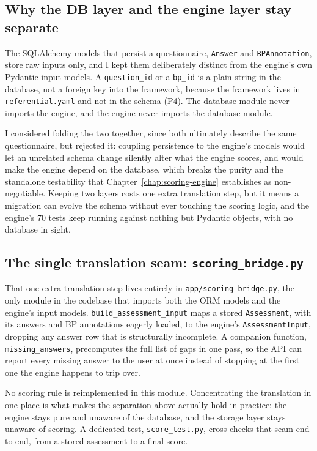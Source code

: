 \subsection{Why the DB layer and the engine layer stay separate}

The SQLAlchemy models that persist a questionnaire, \texttt{Answer} and \texttt{BPAnnotation}, store raw inputs only, and I kept them deliberately distinct from the engine's own Pydantic input models. A \texttt{question\_\allowbreak id} or a \texttt{bp\_\allowbreak id} is a plain string in the database, not a foreign key into the framework, because the framework lives in \texttt{referential.\allowbreak yaml} and not in the schema (P4). The database module never imports the engine, and the engine never imports the database module.

I considered folding the two together, since both ultimately describe the same questionnaire, but rejected it: coupling persistence to the engine's models would let an unrelated schema change silently alter what the engine scores, and would make the engine depend on the database, which breaks the purity and the standalone testability that Chapter~\ref{chap:scoring-engine} establishes as non-negotiable. Keeping two layers costs one extra translation step, but it means a migration can evolve the schema without ever touching the scoring logic, and the engine's 70 tests keep running against nothing but Pydantic objects, with no database in sight.

\subsection{The single translation seam: \texttt{scoring\_\allowbreak bridge.\allowbreak py}}

That one extra translation step lives entirely in \texttt{app/\allowbreak scoring\_\allowbreak bridge.\allowbreak py}, the only module in the codebase that imports both the ORM models and the engine's input models. \texttt{build\_\allowbreak assessment\_\allowbreak input} maps a stored \texttt{Assessment}, with its answers and BP annotations eagerly loaded, to the engine's \texttt{Assessment\allowbreak Input}, dropping any answer row that is structurally incomplete. A companion function, \texttt{missing\_\allowbreak answers}, precomputes the full list of gaps in one pass, so the API can report every missing answer to the user at once instead of stopping at the first one the engine happens to trip over.

No scoring rule is reimplemented in this module. Concentrating the translation in one place is what makes the separation above actually hold in practice: the engine stays pure and unaware of the database, and the storage layer stays unaware of scoring. A dedicated test, \texttt{score\_\allowbreak test.\allowbreak py}, cross-checks that seam end to end, from a stored assessment to a final score.

